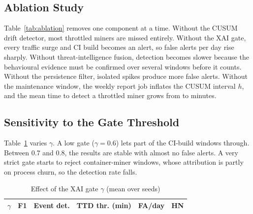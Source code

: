 \documentclass[conference]{IEEEtran}
\begin{document}
\subsection{Ablation Study}
Table~\ref{tab:ablation} removes one component at a time. Without the CUSUM drift detector, most throttled miners are missed entirely. Without the XAI gate, every traffic surge and CI build becomes an alert, so false alerts per day rise sharply. Without threat-intelligence fusion, detection becomes slower because the behavioural evidence must be confirmed over several windows before it counts. Without the persistence filter, isolated spikes produce more false alerts. Without the maintenance window, the weekly report job inflates the CUSUM interval $h$, and the mean time to detect a throttled miner grows from \cgTTDstealthy{} to \nomwTTDstealthy{} minutes.

\begin{table}[t]
\caption{Ablation (mean over \nSeeds{} seeds). Det.\ thr.: throttled-miner detection rate; TTD in minutes for noisy / throttled / container miners}
\label{tab:ablation}
\centering
\scriptsize
\setlength{\tabcolsep}{2.6pt}
\end{table}

\subsection{Sensitivity to the Gate Threshold}
Table~\ref{tab:gate} varies $\gamma$. A low gate ($\gamma=0.6$) lets part of the CI-build windows through. Between 0.7 and 0.8, the results are stable with almost no false alerts. A very strict gate starts to reject container-miner windows, whose attribution is partly on process churn, so the detection rate falls.

\begin{table}[t]
\caption{Effect of the XAI gate $\gamma$ (mean over \nSeeds{} seeds)}
\label{tab:gate}
\centering
\footnotesize
\begin{tabular}{@{}cccccc@{}}
\toprule
$\gamma$ & F1 & Event det. & TTD thr. (min) & FA/day & HN \\
\midrule

\end{tabular}
\end{table}
\end{document}
